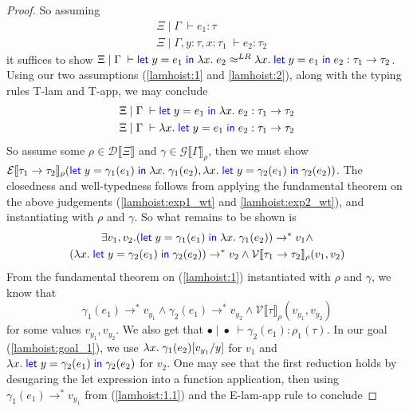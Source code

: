 \documentclass[twoside,11pt,openright]{report}
\theoremstyle{definition}
\newcommand{\var}{x}
\newcommand{\varB}{y}
\newcommand{\expr}{e}
\newcommand{\val}{v}
\newcommand{\subst}[3]{#1{\left[#3 \middle/ #2 \right]}}
\newcommand{\Tfunc}[2]{#1 \rightarrow #2}
\newcommand{\typ}{\tau}
\newcommand{\venv}{\Gamma}
\newcommand{\tenv}{\Xi}
\newcommand{\emptenv}{\bullet}
\newcommand{\empvenv}{\bullet}
\newcommand{\jdg}[4]{#1 \; | \; #2 \; \vdash #3 : #4}
\newcommand{\jdgRel}[6]{#1 \; | \; #2 \; \vdash #3 \approx^{#4} #5 : #6}
\newcommand{\stepS}{\rightarrow^*}
\newcommand{\ValInp}[2]{\mathcal{V} \llbracket #1 \rrbracket_{#2}}
\newcommand{\ExpInp}[2]{\mathcal{E} \llbracket #1 \rrbracket_{#2}}
\newcommand{\VenvInp}[2]{\mathcal{G} \llbracket #1 \rrbracket_{#2}}
\newcommand{\TenvInp}[1]{\mathcal{D} \llbracket #1 \rrbracket}
\newcommand{\LogRel}[5]{\jdgRel{#1}{#2}{#3}{LR}{#4}{#5}}
\begin{document}
\begin{proof}
  So assuming 
  \begin{align}
    &\jdg{\tenv}{\venv}{\expr_1}{\typ}\label{lamhoist:1}\\
    &\jdg{\tenv}{\venv, \varB : \typ, \var : \typ_1}{\expr_2}{\typ_2}\label{lamhoist:2}
  \end{align}
  it suffices to show $\LogRel{\tenv}{\venv}{\Let \varB = \expr_1 in \fun \var . \expr_2}{\fun \var . \Let \varB = \expr_1 in \expr_2}{\Tfunc{\typ_1}{\typ_2}}$. Using our two assumptions (\ref*{lamhoist:1} and \ref*{lamhoist:2}), along with the typing rules T-lam and T-app, we may conclude
  \begin{align}
    &\jdg{\tenv}{\venv}{\Let \varB = \expr_1 in \fun \var . \expr_2}{\Tfunc{\typ_1}{\typ_2}}\label{lamhoist:exp1_wt}\\
    &\jdg{\tenv}{\venv}{\fun \var . \Let \varB = \expr_1 in \expr_2}{\Tfunc{\typ_1}{\typ_2}}\label{lamhoist:exp2_wt}
  \end{align}
  So assume some $\rho \in \TenvInp{\tenv}$ and $\gamma \in \VenvInp{\venv}{\rho}$, then we must show $\ExpInp{\Tfunc{\typ_1}{\typ_2}}{\rho}(\Let \varB = \gamma_1(\expr_1) in \fun \var . \gamma_1(\expr_2), \fun \var . \Let \varB = \gamma_2(\expr_1) in \gamma_2(\expr_2))$.
  The closedness and well-typedness follows from applying the fundamental theorem on the above judgements (\ref*{lamhoist:exp1_wt} and \ref*{lamhoist:exp2_wt}), and instantiating with $\rho$ and $\gamma$. So what remains to be shown is
  \begin{multline}\label{lamhoist:goal_1}
    \exists \val_1, \val_2 . (\Let \varB = \gamma_1(\expr_1) in \fun \var . \gamma_1(\expr_2)) \stepS \val_1 \land\\
    (\fun \var . \Let \varB = \gamma_2(\expr_1) in \gamma_2(\expr_2)) \stepS \val_2 \land
    \ValInp{\Tfunc{\typ_1}{\typ_2}}{\rho}(\val_1, \val_2)
  \end{multline}
  From the fundamental theorem on (\ref{lamhoist:1}) instantiated with $\rho$ and $\gamma$, we know that
  \begin{equation}\label{lamhoist:1.1}
    \gamma_1(\expr_1) \stepS \val_{y_1} \land \gamma_2(\expr_1) \stepS \val_{y_2} \land \ValInp{\typ}{\rho}(\val_{y_1}, \val_{y_2})
  \end{equation}
  for some values $\val_{y_1}, \val_{y_2}$. We also get that $\jdg{\emptenv}{\empvenv}{\gamma_2(\expr_1)}{\rho_1(\typ)}$.
  In our goal (\ref{lamhoist:goal_1}), we use $\fun \var . \subst{\gamma_1(\expr_2)}{\varB}{\val_{y_1}}$ for $\val_1$ and $\fun \var . \Let \varB = \gamma_2(\expr_1) in \gamma_2(\expr_2)$ for $\val_2$. One may see that the first reduction holds by desugaring the let expression into a function application, then using $\gamma_1(\expr_1) \stepS \val_{y_1}$ from (\ref{lamhoist:1.1}) and the E-lam-app rule to conclude

\end{proof}
\end{document}
